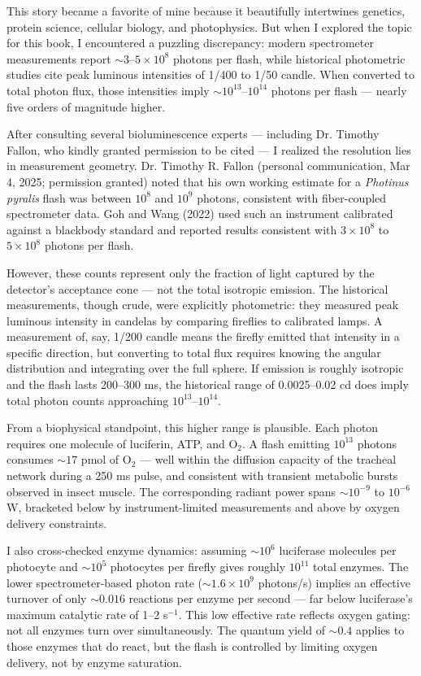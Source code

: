 \begin{commentary}
This story became a favorite of mine because it beautifully intertwines genetics, protein science, cellular biology, and photophysics. But when I explored the topic for this book, I encountered a puzzling discrepancy: modern spectrometer measurements report $\sim 3$–$5 \times 10^8$ photons per flash, while historical photometric studies cite peak luminous intensities of 1/400 to 1/50 candle. When converted to total photon flux, those intensities imply $\sim 10^{13}$–$10^{14}$ photons per flash — nearly five orders of magnitude higher.

After consulting several bioluminescence experts — including Dr. Timothy Fallon, who kindly granted permission to be cited — I realized the resolution lies in measurement geometry. Dr. Timothy R. Fallon (personal communication, Mar 4, 2025; permission granted) noted that his own working estimate for a \textit{Photinus pyralis} flash was between $10^8$ and $10^9$ photons, consistent with fiber-coupled spectrometer data. Goh and Wang (2022) used such an instrument calibrated against a blackbody standard and reported results consistent with $3 \times 10^8$ to $5 \times 10^8$ photons per flash.

However, these counts represent only the fraction of light captured by the detector's acceptance cone — not the total isotropic emission. The historical measurements, though crude, were explicitly photometric: they measured peak luminous intensity in candelas by comparing fireflies to calibrated lamps. A measurement of, say, 1/200 candle means the firefly emitted that intensity in a specific direction, but converting to total flux requires knowing the angular distribution and integrating over the full sphere. If emission is roughly isotropic and the flash lasts 200–300 ms, the historical range of 0.0025–0.02 cd does imply total photon counts approaching $10^{13}$–$10^{14}$.

From a biophysical standpoint, this higher range is plausible. Each photon requires one molecule of luciferin, ATP, and O$_2$. A flash emitting $10^{13}$ photons consumes $\sim 17$ pmol of O$_2$ — well within the diffusion capacity of the tracheal network during a 250 ms pulse, and consistent with transient metabolic bursts observed in insect muscle. The corresponding radiant power spans $\sim 10^{-9}$ to $10^{-6}$ W, bracketed below by instrument-limited measurements and above by oxygen delivery constraints.

I also cross-checked enzyme dynamics: assuming $\sim 10^6$ luciferase molecules per photocyte and $\sim 10^5$ photocytes per firefly gives roughly $10^{11}$ total enzymes. The lower spectrometer-based photon rate ($\sim 1.6 \times 10^9$ photons/s) implies an effective turnover of only $\sim 0.016$ reactions per enzyme per second — far below luciferase's maximum catalytic rate of 1–2 s$^{-1}$. This low effective rate reflects oxygen gating: not all enzymes turn over simultaneously. The quantum yield of $\sim 0.4$ applies to those enzymes that do react, but the flash is controlled by limiting oxygen delivery, not by enzyme saturation.


\end{commentary}
